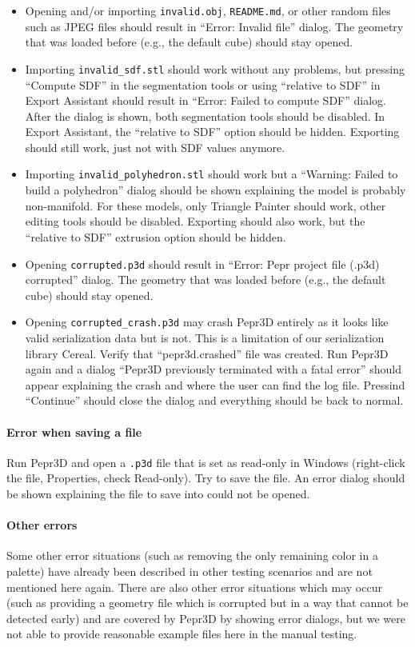 \begin{itemize}
\item Opening and/or importing \texttt{invalid.obj}, \texttt{README.md}, or other random files such as JPEG files should result in ``Error: Invalid file'' dialog. The geometry that was loaded before (e.g., the default cube) should stay opened.
\item Importing \texttt{invalid\_sdf.stl} should work without any problems, but pressing ``Compute SDF'' in the segmentation tools or using ``relative to SDF'' in Export Assistant should result in ``Error: Failed to compute SDF'' dialog. After the dialog is shown, both segmentation tools should be disabled. In Export Assistant, the ``relative to SDF'' option should be hidden. Exporting should still work, just not with SDF values anymore.
\item Importing \texttt{invalid\_polyhedron.stl} should work but a ``Warning: Failed to build a polyhedron'' dialog should be shown explaining the model is probably non-manifold. For these models, only Triangle Painter should work, other editing tools should be disabled. Exporting should also work, but the ``relative to SDF'' extrusion option should be hidden.
\item Opening \texttt{corrupted.p3d} should result in ``Error: Pepr project file (.p3d) corrupted'' dialog. The geometry that was loaded before (e.g., the default cube) should stay opened.
\item Opening \texttt{corrupted\_crash.p3d} may crash Pepr3D entirely as it looks like valid serialization data but is not. This is a limitation of our serialization library Cereal. Verify that ``pepr3d.crashed'' file was created. Run Pepr3D again and a dialog ``Pepr3D previously terminated with a fatal error'' should appear explaining the crash and where the user can find the log file. Pressind ``Continue'' should close the dialog and everything should be back to normal.
\end{itemize}

\paragraph{Error when saving a file}
Run Pepr3D and open a \texttt{.p3d} file that is set as read-only in Windows (right-click the file, Properties, check Read-only).
Try to save the file.
An error dialog should be shown explaining the file to save into could not be opened.

\paragraph{Other errors}
Some other error situations (such as removing the only remaining color in a palette) have already been described in other testing scenarios and are not mentioned here again.
There are also other error situations which may occur (such as providing a geometry file which is corrupted but in a way that cannot be detected early) and are covered by Pepr3D by showing error dialogs, but we were not able to provide reasonable example files here in the manual testing.

